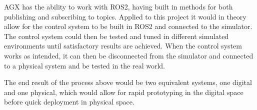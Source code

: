 AGX has the ability to work with ROS2, having built in methods for both publishing and subscribing to topics. Applied to this project it would in theory allow for the control system to be built in ROS2 and connected to the simulator. The control system could then be tested and tuned in different simulated environments until satisfactory results are achieved. When the control system works as intended, it can then be disconnected from the simulator and connected to a physical system and be tested in the real world.

The end result of the process above would be two equivalent systems, one digital and one physical, which would allow for rapid prototyping in the digital space before quick deployment in physical space. 

